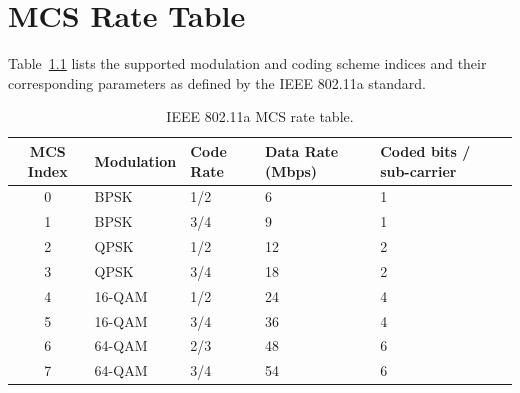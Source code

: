 \documentclass[12pt, a4paper, oneside]{report}
\begin{document}
\chapter{MCS Rate Table}

Table~\ref{tab:mcs_table} lists the supported modulation and coding scheme indices and their corresponding parameters as defined by the IEEE 802.11a standard.

\begin{table}[H]
  \centering
  \caption{IEEE 802.11a MCS rate table.}
  \label{tab:mcs_table}
  \begin{tabular}{cllll}
    \toprule
    \textbf{MCS Index} & \textbf{Modulation} & \textbf{Code Rate} & \textbf{Data Rate (Mbps)} & \textbf{Coded bits / sub-carrier} \\
    \midrule
    0 & BPSK  & 1/2 &  6 & 1 \\
    1 & BPSK  & 3/4 &  9 & 1 \\
    2 & QPSK  & 1/2 & 12 & 2 \\
    3 & QPSK  & 3/4 & 18 & 2 \\
    4 & 16-QAM & 1/2 & 24 & 4 \\
    5 & 16-QAM & 3/4 & 36 & 4 \\
    6 & 64-QAM & 2/3 & 48 & 6 \\
    7 & 64-QAM & 3/4 & 54 & 6 \\
    \bottomrule
  \end{tabular}
\end{table}
\end{document}

